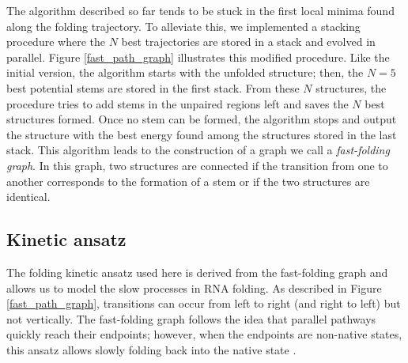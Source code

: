 The algorithm described so far tends to be stuck in the first local minima found along the folding trajectory. To alleviate this, we implemented a stacking procedure where the \(N\) best trajectories are stored in a stack and evolved in parallel. Figure \ref{fast_path_graph} illustrates this modified procedure. Like the initial version, the algorithm starts with the unfolded structure; then, the \(N=5\) best potential stems are stored in the first stack. From these \(N\) structures, the procedure tries to add stems in the unpaired regions left and saves the \(N\) best structures formed. Once no stem can be formed, the algorithm stops and output the structure with the best energy found among the structures stored in the last stack. This algorithm leads to the construction of a graph we call a \emph{fast-folding graph}. In this graph, two structures are connected if the transition from one to another corresponds to the formation of a stem or if the two structures are identical.



\subsection{Kinetic ansatz}
The folding kinetic ansatz used here is derived from the fast-folding graph and allows us to model the slow processes in RNA folding. As described in Figure \ref{fast_path_graph}, transitions can occur from left to right (and right to left) but not vertically. The fast-folding graph follows the idea that parallel pathways quickly reach their endpoints; however, when the endpoints are non-native states, this ansatz allows slowly folding back into the native state \cite{pan97_foldin_rna_invol_paral_pathw}. 

